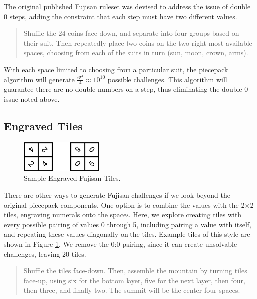 \documentclass[journal]{IEEEtran}
\begin{document}
The original published Fujisan ruleset was devised to address the issue of double 0 steps, adding the constraint that each step must have two different values.

\begin{quote}
    
  Shuffle the 24 coins face-down, and separate into four groups based on their suit. Then repeatedly place two coins on the two right-most available spaces, choosing from each of the suits in turn (sun, moon, crown, arms).
\end{quote}


With each space limited to choosing from a particular suit, the piecepack algorithm will generate $\frac{6!^4}{4} \approx 10^{10}$ possible challenges. 
This algorithm will guarantee there are no double numbers on a step, thus eliminating the double 0 issue noted above. 

\subsection{Engraved Tiles}

\begin{figure}[t]
\centering
\includegraphics[width=4cm]{engravedsample.png}
\caption{Sample Engraved Fujisan Tiles.}
\label{fig:engravedsample}
\end{figure}


There are other ways to generate Fujisan challenges if we look beyond the original piecepack components. One option is to combine the values with the 2$\times$2 tiles, engraving
numerals onto the spaces. Here, we explore creating tiles with every possible pairing of values 0 through 5, including pairing a value with itself, and repeating these values diagonally on the tiles. Example tiles of this style are shown in Figure \ref{fig:engravedsample}. We remove the 0:0 pairing, since it can create unsolvable challenges, leaving 20 tiles.

\begin{quote}
    
  Shuffle the tiles face-down. Then, assemble the mountain by turning tiles face-up, using six for the bottom layer, five for the next layer, then four, then three, and finally two. The summit will be the center four spaces.
\end{quote}
\end{document}
